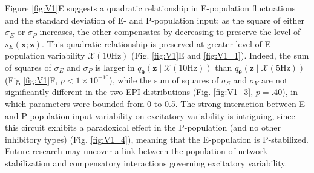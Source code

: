 \documentclass[11pt]{article}
\begin{document}
Figure \ref{fig:V1}E suggests a quadratic relationship in E-population fluctuations and the standard deviation of E- and P-population input; as the square of either $\sigma_E$ or $\sigma_P$ increases, the other compensates by decreasing to preserve the level of $s_E(\mathbf{x}; \mathbf{z})$.
This quadratic relationship is preserved at greater level of E-population variability $\mathcal{X}(10\text{Hz})$ (Fig. \ref{fig:V1}E and \ref{fig:V1_1}).
Indeed, the sum of squares of $\sigma_E$ and $\sigma_P$ is larger in $q_{\bm{\theta}}(\mathbf{z} \mid \mathcal{X}(10\text{Hz}))$ than $q_{\bm{\theta}}(\mathbf{z} \mid \mathcal{X}(5\text{Hz}))$ (Fig \ref{fig:V1}F, $p < 1 \times 10^{-10}$), while the sum of squares of $\sigma_S$ and $\sigma_V$ are not significantly different in the two EPI distributions (Fig. \ref{fig:V1_3}, $p=.40$), in which parameters were bounded from 0 to 0.5.
The strong interaction between E- and P-population input variability on excitatory variability is intriguing, since this circuit exhibits a paradoxical effect in the P-population (and no other inhibitory types) (Fig. \ref{fig:V1_4}), meaning that the E-population is P-stabilized.
Future research may uncover a link between the population of network stabilization and compensatory interactions governing excitatory variability.


\end{document}
